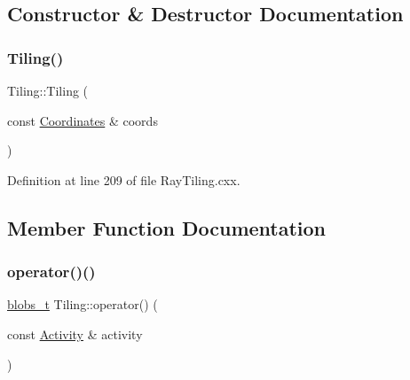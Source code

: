 \subsection{Constructor \& Destructor Documentation}
\mbox{\label{class_wire_cell_1_1_ray_grid_1_1_tiling_a1a885ef52cc81510e4c593342c7af6fb}} 
\subsubsection{\texorpdfstring{Tiling()}{Tiling()}}
{\footnotesize\ttfamily Tiling\+::\+Tiling (\begin{DoxyParamCaption}\item[{const \hyperlink{class_wire_cell_1_1_ray_grid_1_1_coordinates}{Coordinates} \&}]{coords }\end{DoxyParamCaption})}



Definition at line 209 of file Ray\+Tiling.\+cxx.



\subsection{Member Function Documentation}
\mbox{\label{class_wire_cell_1_1_ray_grid_1_1_tiling_a9ca2b3532778d7582d8166e7b96db7c3}} 
\subsubsection{\texorpdfstring{operator()()}{operator()()}\hspace{0.1cm}{\footnotesize\ttfamily [1/2]}}
{\footnotesize\ttfamily \hyperlink{namespace_wire_cell_1_1_ray_grid_aea2069aff62790df3241ee7446e81ade}{blobs\+\_\+t} Tiling\+::operator() (\begin{DoxyParamCaption}\item[{const \hyperlink{class_wire_cell_1_1_ray_grid_1_1_activity}{Activity} \&}]{activity }\end{DoxyParamCaption})}



